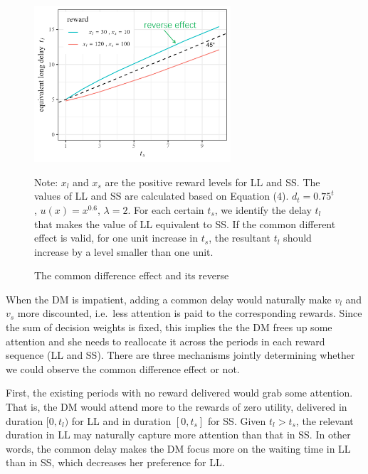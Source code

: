 \documentclass[
  12pt,
]{article}
\begin{document}
\begin{figure}[h]
  \centering   
  \includegraphics[width=0.65\textwidth]{figures/common_diff.png}   
  \caption{The common difference effect and its reverse}
  \vspace{8pt}
  \begin{minipage}{1.0\textwidth}
{\par\footnotesize Note: $x_l$ and $x_s$ are the positive reward levels for LL and SS. The values of LL and SS are calculated based on Equation (4). $d_t=0.75^t$, $u(x)=x^{0.6}$, $\lambda=2$. For each certain $t_s$, we identify the delay $t_l$ that makes the value of LL equivalent to SS. If the common different effect is valid, for one unit increase in $t_s$, the resultant $t_l$ should increase by a level smaller than one unit. }
\end{minipage}
  \label{fig:common_diff} 
\end{figure}

When the DM is impatient, adding a common delay would naturally make
\(v_l\) and \(v_s\) more discounted, i.e.~less attention is paid to the
corresponding rewards. Since the sum of decision weights is fixed, this
implies the the DM frees up some attention and she needs to reallocate
it across the periods in each reward sequence (LL and SS). There are
three mechanisms jointly determining whether we could observe the common
difference effect or not.

First, the existing periods with no reward delivered would grab some
attention. That is, the DM would attend more to the rewards of zero
utility, delivered in duration \([0,t_l)\) for LL and in duration
\([0,t_s]\) for SS. Given \(t_l >t_s\), the relevant duration in LL may
naturally capture more attention than that in SS. In other words, the
common delay makes the DM focus more on the waiting time in LL than in
SS, which decreases her preference for LL.
\end{document}
